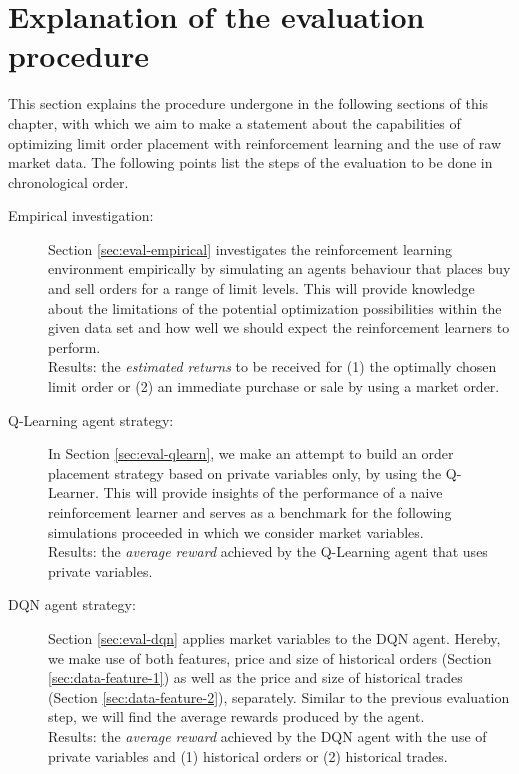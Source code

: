 \section{Explanation of the evaluation procedure}
This section explains the procedure undergone in the following sections of this chapter, with which we aim to make a statement about the capabilities of optimizing limit order placement with reinforcement learning and the use of raw market data.
The following points list the steps of the evaluation to be done in chronological order.
\begin{description}
    \item[Empirical investigation: ]
    Section \ref{sec:eval-empirical} investigates the reinforcement learning environment empirically by simulating an agents behaviour that places buy and sell orders for a range of limit levels.
    This will provide knowledge about the limitations of the potential optimization possibilities within the given data set and how well we should expect the reinforcement learners to perform.
    \\
    Results: the \textit{estimated returns} to be received for (1) the optimally chosen limit order or (2) an immediate purchase or sale by using a market order.
    
    \item[Q-Learning agent strategy: ]
    In Section \ref{sec:eval-qlearn}, we make an attempt to build an order placement strategy based on private variables only, by using the Q-Learner.
    This will provide insights of the performance of a naive reinforcement learner and serves as a benchmark for the following simulations proceeded in which we consider market variables.
    \\
    Results: the \textit{average reward} achieved by the Q-Learning agent that uses private variables.

    \item[DQN agent strategy: ]
    Section \ref{sec:eval-dqn} applies market variables to the DQN agent.
    Hereby, we make use of both features, price and size of historical orders (Section \ref{sec:data-feature-1}) as well as the price and size of historical trades (Section \ref{sec:data-feature-2}), separately.
    Similar to the previous evaluation step, we will find the average rewards produced by the agent.
    \\
    Results: the \textit{average reward} achieved by the DQN agent with the use of private variables and (1) historical orders or (2) historical trades.


\end{description}
